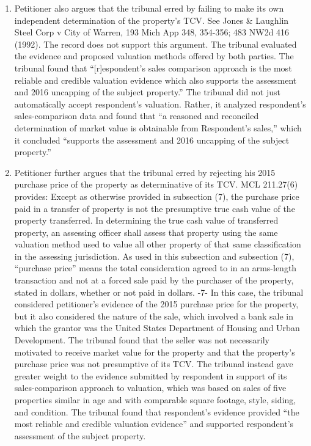 \documentclass[12pt,\documentclassflag]{michiganCourtOfAppealsBrief}
\begin{document}
\begin{enumerate}
\item Petitioner also argues that the tribunal erred by failing to make its own independent
determination of the property's TCV. See Jones \& Laughlin Steel Corp v City of Warren, 193
Mich App 348, 354-356; 483 NW2d 416 (1992). The record does not support this argument. The
tribunal evaluated the evidence and proposed valuation methods offered by both parties. The
tribunal found that ``[r]espondent's sales comparison approach is the most reliable and credible
valuation evidence which also supports the assessment and 2016 uncapping of the subject
property.'' The tribunal did not just automatically accept respondent's valuation. Rather, it
analyzed respondent's sales-comparison data and found that ``a reasoned and reconciled
determination of market value is obtainable from Respondent's sales,'' which it concluded
``supports the assessment and 2016 uncapping of the subject property.''

\item Petitioner further argues that the tribunal erred by rejecting his 2015 purchase price of the
property as determinative of its TCV. MCL 211.27(6) provides:
Except as otherwise provided in subsection (7), the purchase price paid in a
transfer of property is not the presumptive true cash value of the property
transferred. In determining the true cash value of transferred property, an assessing
officer shall assess that property using the same valuation method used to value all
other property of that same classification in the assessing jurisdiction. As used in
this subsection and subsection (7), ``purchase price'' means the total consideration
agreed to in an arms-length transaction and not at a forced sale paid by the purchaser
of the property, stated in dollars, whether or not paid in dollars.
-7-
In this case, the tribunal considered petitioner's evidence of the 2015 purchase price for the
property, but it also considered the nature of the sale, which involved a bank sale in which the
grantor was the United States Department of Housing and Urban Development. The tribunal found
that the seller was not necessarily motivated to receive market value for the property and that the
property's purchase price was not presumptive of its TCV. The tribunal instead gave greater
weight to the evidence submitted by respondent in support of its sales-comparison approach to
valuation, which was based on sales of five properties similar in age and with comparable square
footage, style, siding, and condition. The tribunal found that respondent's evidence provided ``the
most reliable and credible valuation evidence'' and supported respondent's assessment of the
subject property. 

\end{enumerate}
\end{document}
